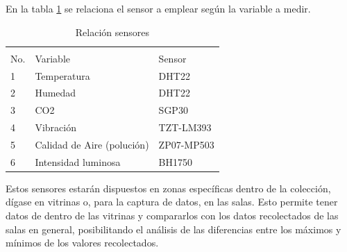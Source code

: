 En la tabla \ref{tab:relacion_sensores} se relaciona el sensor a emplear según la variable a medir.

    \begin{table}[H]
        \centering
        \caption{Relación sensores}
        \label{tab:relacion_sensores}
        \begin{tabular}{|l|l|l|}
        \hline
        \cellcolor[HTML]{9698ED}                      & \cellcolor[HTML]{9698ED}                           & \cellcolor[HTML]{9698ED}                         \\
        \multirow{-2}{*}{\cellcolor[HTML]{9698ED}No.} & \multirow{-2}{*}{\cellcolor[HTML]{9698ED}Variable} & \multirow{-2}{*}{\cellcolor[HTML]{9698ED}Sensor} \\ \hline
        1                                             & Temperatura                                        & DHT22                                            \\ \hline
        2                                             & Humedad                                            & DHT22                                            \\ \hline
        3                                             & CO2                                                & SGP30                                            \\ \hline
        4                                             & Vibración                                          & TZT-LM393                                        \\ \hline
        5                                             & Calidad de Aire (polución)                         & ZP07-MP503                                       \\ \hline
        6                                             & Intensidad luminosa                                & BH1750                                           \\ \hline
        \end{tabular}
    \end{table}

Estos sensores estarán dispuestos en zonas específicas dentro de la colección, dígase en vitrinas o, para la captura de datos, en las salas.
Esto permite tener datos de dentro de las vitrinas y compararlos con los datos recolectados de las salas en general, posibilitando el análisis de las diferencias entre los máximos y mínimos de los valores recolectados.
    

